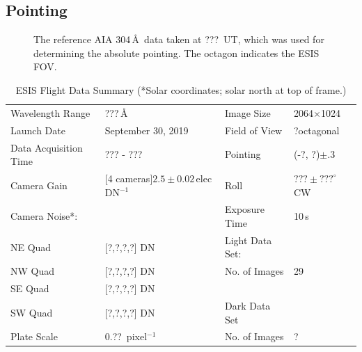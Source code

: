 	\subsection{Pointing} \label{sec:point}
		
		\begin{figure}[ht]
			\begin{center}
				\caption{The reference AIA 304\,\AA\ data taken at ???~UT, which was used for determining the absolute pointing. The octagon indicates the ESIS FOV.}
				\label{fig:fov}
			\end{center}
		\end{figure}
	
		\begin{center}
			\begin{table}
				\caption{ESIS Flight Data Summary (*Solar coordinates; solar north at top of frame.)}
				\label{tab:data_info}
				\begin{tabular}{ll | l l}\hline
					Wavelength Range &   ???\,\AA\  & Image Size  & 2064$\times$1024\\
					Launch Date & September 30, 2019 & Field of View  & ?\arcmin octagonal \\
					Data Acquisition Time & ??? - ??? & Pointing  & (-?\arcsec, ?\arcsec)$\pm .3$\arcsec  \\
					Camera Gain &   [4 cameras]$2.5 \pm 0.02$\,elec DN$^{-1}$ & Roll & $??? \pm ???^\circ$ CW \\
					Camera Noise*: & & Exposure Time & 10\,s\\
					\hspace{0.2in}NE Quad & [?,?,?,?] DN & Light Data Set: &\\
					\hspace{0.2in}NW Quad & [?,?,?,?] DN & \hspace{0.2in}No. of Images & 29\\
					\hspace{0.2in}SE Quad  & [?,?,?,?] DN & &\\
					\hspace{0.2in}SW Quad  & [?,?,?,?] DN & Dark Data Set & \\
					Plate Scale  & 0.??\arcsec\ pixel$^{-1}$ &  \hspace{0.2in}No. of Images & ? \\
					\hline
				\end{tabular}
			\end{table}
		\end{center}
		

